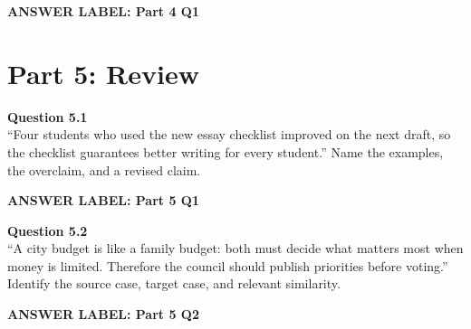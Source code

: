 \documentclass[12pt]{article}
\newcommand{\answerbox}[2]{%
\vspace{0.15em}
\noindent\textbf{#1}\par
\vspace{0.05em}
\noindent\fbox{%
\begin{minipage}[t][#2]{\dimexpr\textwidth-2\fboxsep-2\fboxrule}
\rule{\textwidth}{0pt}
\vspace{#2}
\end{minipage}
}\par
\vspace{0.25em}
}
\begin{document}
\answerbox{ANSWER LABEL: Part 4 Q1}{3.15in}

\newpage

\section*{Part 5: Review}

\textbf{Question 5.1}\\[-0.15em]
``Four students who used the new essay checklist improved on the next draft, so the checklist guarantees better writing for every student.'' Name the examples, the overclaim, and a revised claim.

\answerbox{ANSWER LABEL: Part 5 Q1}{2.25in}

\textbf{Question 5.2}\\[-0.15em]
``A city budget is like a family budget: both must decide what matters most when money is limited. Therefore the council should publish priorities before voting.'' Identify the source case, target case, and relevant similarity.

\answerbox{ANSWER LABEL: Part 5 Q2}{2.05in}
\end{document}
